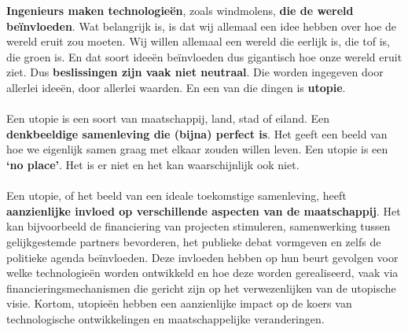 \documentclass[../summary.tex]{subfiles}
\begin{document}
	\textbf{Ingenieurs maken technologieën}, zoals windmolens, \textbf{die de wereld beïnvloeden}. Wat belangrijk is, is dat wij allemaal een idee hebben over hoe de wereld eruit zou moeten. Wij willen allemaal een wereld die eerlijk is, die tof is, die groen is. En dat soort ideeën beïnvloeden dus gigantisch hoe onze wereld eruit ziet. Dus \textbf{beslissingen zijn vaak niet neutraal}. Die worden ingegeven door allerlei ideeën, door allerlei waarden. En een van die dingen is \textbf{utopie}. \\
	\\
	Een utopie is een soort van maatschappij, land, stad of eiland. Een \textbf{denkbeeldige samenleving die (bijna) perfect is}. Het geeft een beeld van hoe we eigenlijk samen graag met elkaar zouden willen leven. Een utopie is een \textbf{`no place'}. Het is er niet en het kan waarschijnlijk ook niet.\\
	\\
	Een utopie, of het beeld van een ideale toekomstige samenleving, heeft \textbf{aanzienlijke invloed op verschillende aspecten van de maatschappij}. Het kan bijvoorbeeld de financiering van projecten stimuleren, samenwerking tussen gelijkgestemde partners bevorderen, het publieke debat vormgeven en zelfs de politieke agenda beïnvloeden. Deze invloeden hebben op hun beurt gevolgen voor welke technologieën worden ontwikkeld en hoe deze worden gerealiseerd, vaak via financieringsmechanismen die gericht zijn op het verwezenlijken van de utopische visie. Kortom, utopieën hebben een aanzienlijke impact op de koers van technologische ontwikkelingen en maatschappelijke veranderingen.
	
\end{document}
